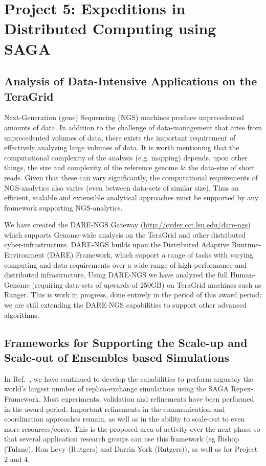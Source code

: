 \documentclass[a4paper,12pt]{article}
\begin{document}
\section{Project 5: Expeditions in Distributed Computing using SAGA}

\subsection{Analysis of Data-Intensive Applications on the TeraGrid}

Next-Generation (gene) Sequencing (NGS) machines produce unprecedented amounts of data.  In addition to the challenge of data-management that arise from unprecedented volumes of data, there exists the important requirement of effectively analyzing large volumes of data.  It is worth mentioning that the computational complexity of the analysis (e.g. mapping) depends, upon other things, the size and complexity of the reference genome \& the data-size of short reads.  Given that these can vary significantly, the computational requirements of NGS-analytics also varies (even between data-sets of similar size).  Thus an efficient, scalable and extensible analytical approaches must be supported by any framework supporting NGS-analytics.

We have created the DARE-NGS Gateway (\url{http://cyder.cct.lsu.edu/dare-ngs}) which supports Genome-wide analysis on the TeraGrid and other distributed cyber-infrastructure.  DARE-NGS builds upon the Distributed Adaptive Runtime-Environment (DARE) Framework, which support a range of tasks with varying computing and data requirements over a wide range of high-performance and distributed infrastructure.  Using DARE-NGS we have analyzed the full Human-Genome (requiring data-sets of upwards of 250GB) on TeraGrid machines such as Ranger. This is work in progress, done entirely in the period of this award period; we are still extending the DARE-NGS capabilities to support other advanced algorithms\cite{ecmls11}.

\subsection{Frameworks for Supporting the Scale-up and Scale-out of Ensembles based Simulations}

In Ref.~\cite{async-re}, we have continued to develop the capabilities to perform arguably the world's largest number of replica-exchange simulations using the SAGA Repex-Framework. Most experiments, validation and refinements have been performed in the award period. Important refinements in the communication and coordination approaches remain, as well as in the ability to scale-out to even more resources/cores. This is the proposed area of activity over the next phase so that several application research groups can use this framework (eg Bishop (Tulane), Ron Levy (Rutgers) and Darrin York (Rutgers)), as well as for Project 2 and 4.
\end{document}
